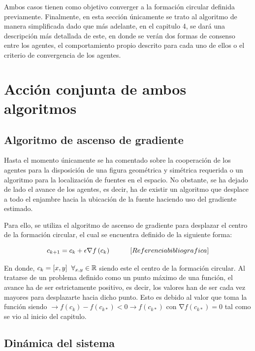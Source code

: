 Ambos casos tienen como objetivo converger a la formación circular definida previamente. Finalmente, en esta sección únicamente se trato al algoritmo de manera simplificada dado que más adelante, en el capitulo 4, se dará una descripción más detallada de este, en donde se verán dos formas de consenso entre los agentes, el comportamiento propio descrito para cada uno de ellos o el criterio de convergencia de los agentes.

\section{Acción conjunta de ambos algoritmos}

\subsection{Algoritmo de ascenso de gradiente}

Hasta el momento únicamente se ha comentado sobre la cooperación de los agentes para la disposición de una figura geométrica y simétrica requerida o un algoritmo para la localización de fuentes en el espacio. No obstante, se ha dejado de lado el avance de los agentes, es decir, ha de existir un algoritmo que desplace a todo el enjambre hacia la ubicación de la fuente haciendo uso del gradiente estimado.

Para ello, se utiliza el algoritmo de ascenso de gradiente para desplazar el centro de la formación circular, el cual se encuentra definido de la siguiente forma:

\begin{equation}\label{GA}
	c_{k+1}=c_k+\epsilon\nabla{f}\left(c_k\right)\hspace{10mm}[Referencia bibliografica]
\end{equation}

En donde, $c_k=[x,y]\hspace{2mm}\forall_{x,y}\in\mathbb{R}$ siendo este el centro de la formación circular. Al tratarse de un problema definido como un punto máximo de una función, el avance ha de ser estrictamente positivo, es decir, los valores han de ser cada vez mayores para desplazarte hacia dicho punto. Esto es debido al valor que toma la función siendo $\rightarrow{f}\left(c_k\right)-f\left(c_{k*}\right)<0\rightarrow{f}\left(c_{k*}\right)$ con $\mathrm{\nabla}{f}{\left(c_{k*}\right)}=0$ tal como se vio al inicio del capitulo.

\subsection{Dinámica del sistema}


